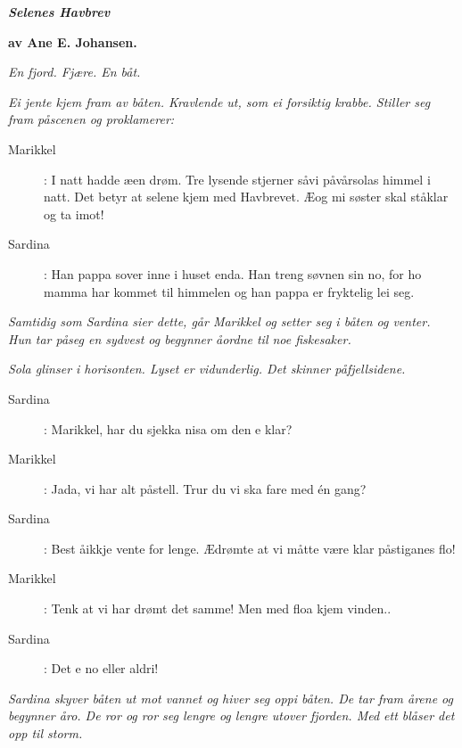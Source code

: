 \bigskip
\bigskip
\bigskip
\bigskip

\begin{center}
  \LARGE\bfseries{\textsl{Selenes Havbrev}}
\end{center}
\label{shtp1}

\bigskip
\bigskip
{\small 
\hfill \textbf{av Ane E. Johansen.}

\bigskip 
 \bigskip

\noindent \textit{\color{gray} En fjord. Fj\ae re. En b\aa t.}

\noindent \textit{\color{gray} Ei jente kjem fram av b\aa ten. Kravlende ut, som ei forsiktig krabbe. Stiller seg fram p\aa  scenen og proklamerer:}

\begin{description}
\item[Marikkel]: I natt hadde \ae  en dr\o{}m. Tre lysende stjerner s\aa  vi p\aa  v\aa rsolas himmel i natt. Det betyr at selene kjem med Havbrevet. \AE  og mi s\o{}ster skal st\aa  klar og ta imot! 
\item[Sardina]: Han pappa sover inne i huset enda. Han treng s\o{}vnen sin no, for ho mamma har kommet til himmelen og han pappa er fryktelig lei seg.
\end{description}

\noindent \textit{\color{gray} Samtidig som Sardina sier dette, g\aa r Marikkel og setter seg i b\aa ten og venter. Hun tar p\aa  seg en sydvest og begynner \aa  ordne til noe fiskesaker.}

\noindent \textit{\color{gray} Sola glinser i horisonten. Lyset er vidunderlig. Det skinner p\aa  fjellsidene.}

\begin{description}
\item[Sardina]: Marikkel, har du sjekka nisa om den e klar?
\item[Marikkel]: Jada, vi har alt p\aa  stell. Trur du vi ska fare med \'{e}n gang?
\item[Sardina]: Best \aa  ikkje vente for lenge. \AE  dr\o{}mte at vi m\aa tte v\ae re klar p\aa  stiganes flo!
\item[Marikkel]: Tenk at vi har dr\o{}mt det samme! Men med floa kjem vinden..
\item[Sardina]: Det e no eller aldri!
\end{description}

\noindent \textit{\color{gray} Sardina skyver b\aa ten ut mot vannet og hiver seg oppi b\aa ten. De tar fram \aa rene og begynner \aa  ro. De ror og ror seg lengre og lengre utover fjorden. Med ett bl\aa ser det opp til storm.}

}
